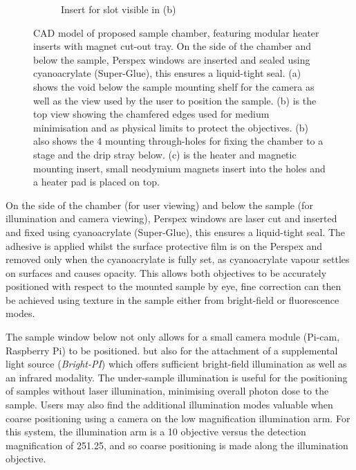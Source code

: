 \begin{figure}
\begin{subfigure}[b]{0.4\linewidth}
         \caption{Insert for slot visible in (b)}
         \label{fig:chamber_slide}
    \end{subfigure}
    \caption{CAD model of proposed sample chamber, featuring modular heater inserts with magnet cut-out tray.
    On the side of the chamber and below the sample, Perspex windows are inserted and sealed using cyanoacrylate (Super-Glue), this ensures a liquid-tight seal.
    (a) shows the void below the sample mounting shelf for the camera as well as the view used by the user to position the sample.
    (b) is the top view showing the chamfered edges used for medium minimisation and as physical limits to protect the objectives.
    (b) also shows the 4 mounting through-holes for fixing the chamber to a stage and the drip stray below.
    (c) is the heater and magnetic mounting insert, small neodymium magnets insert into the holes and a heater pad is placed on top.
    }
\end{figure}

On the side of the chamber (for user viewing) and below the sample (for illumination and camera viewing), Perspex windows are laser cut and inserted and fixed using cyanoacrylate (Super-Glue), this ensures a liquid-tight seal.
The adhesive is applied whilst the surface protective film is on the Perspex and removed only when the cyanoacrylate is fully set, as cyanoacrylate vapour settles on surfaces and causes opacity.
This allows both objectives to be accurately positioned with respect to the mounted sample by eye, fine correction can then be achieved using texture in the sample either from bright-field or fluorescence modes.

The sample window below not only allows for a small camera module (Pi-cam, Raspberry Pi) to be positioned.
but also for the attachment of a supplemental light source (\emph{Bright-PI}) which offers sufficient bright-field illumination as well as an infrared modality.
The under-sample illumination is useful for the positioning of samples without laser illumination, minimising overall photon dose to the sample.
Users may also find the additional illumination modes valuable when coarse positioning using a camera on the low magnification illumination arm.
For this system, the illumination arm is a \SI{10}{\times} objective versus the detection magnification of \SI{25}{\times}\SI{1.25}{\times}, and so coarse positioning is made along the illumination objective.

